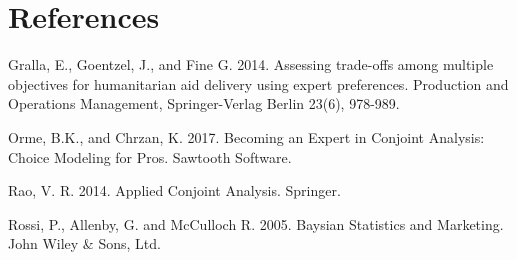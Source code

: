\documentclass{SBCbookchapter}
\begin{document}
\section*{References}
\begin{list}{}{\itemindent=-2em}
\small


\item Gralla, E., Goentzel, J., and Fine G. 2014. Assessing trade-offs among multiple objectives for humanitarian aid delivery using expert preferences.
Production and Operations Management, Springer-Verlag Berlin 23(6), 978-989.

\item Orme, B.K., and Chrzan, K. 2017. Becoming an Expert in Conjoint Analysis: Choice Modeling for Pros. Sawtooth Software.

\item Rao, V. R. 2014. Applied Conjoint Analysis. Springer.


\item Rossi, P., Allenby, G. and McCulloch R. 2005. Baysian Statistics and Marketing. John Wiley \& Sons, Ltd.


\end{list}
\end{document}
